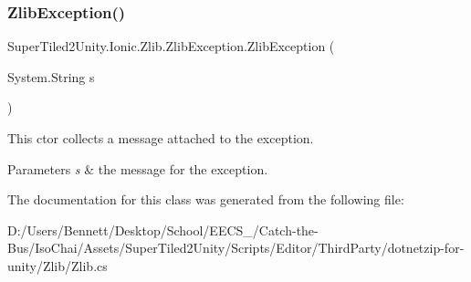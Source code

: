 \subsubsection{\texorpdfstring{Zlib\+Exception()}{ZlibException()}\hspace{0.1cm}{\footnotesize\ttfamily [2/2]}}
{\footnotesize\ttfamily Super\+Tiled2\+Unity.\+Ionic.\+Zlib.\+Zlib\+Exception.\+Zlib\+Exception (\begin{DoxyParamCaption}\item[{System.\+String}]{s }\end{DoxyParamCaption})}



This ctor collects a message attached to the exception. 


\begin{DoxyParams}{Parameters}
{\em s} & the message for the exception.\\
\hline
\end{DoxyParams}


The documentation for this class was generated from the following file\+:\begin{DoxyCompactItemize}
\item 
D\+:/\+Users/\+Bennett/\+Desktop/\+School/\+E\+E\+C\+S\+\_/\+Catch-\/the-\/\+Bus/\+Iso\+Chai/\+Assets/\+Super\+Tiled2\+Unity/\+Scripts/\+Editor/\+Third\+Party/dotnetzip-\/for-\/unity/\+Zlib/Zlib.\+cs\end{DoxyCompactItemize}
